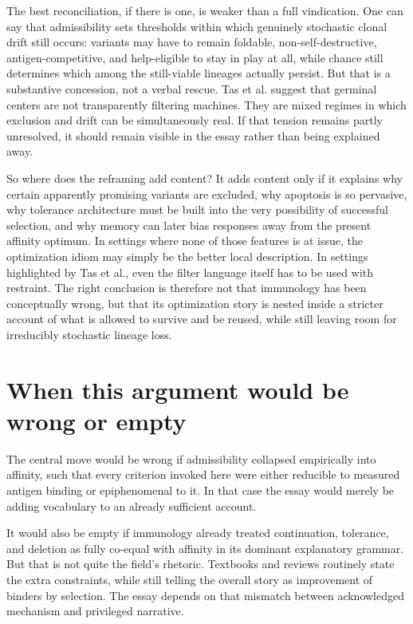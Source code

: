 \documentclass[11pt]{article}
\begin{document}
The best reconciliation, if there is one, is weaker than a full vindication. One can say that admissibility sets thresholds within which genuinely stochastic clonal drift still occurs: variants may have to remain foldable, non-self-destructive, antigen-competitive, and help-eligible to stay in play at all, while chance still determines which among the still-viable lineages actually persist. But that is a substantive concession, not a verbal rescue. Tas et al. suggest that germinal centers are not transparently filtering machines. They are mixed regimes in which exclusion and drift can be simultaneously real. If that tension remains partly unresolved, it should remain visible in the essay rather than being explained away.

So where does the reframing add content? It adds content only if it explains why certain apparently promising variants are excluded, why apoptosis is so pervasive, why tolerance architecture must be built into the very possibility of successful selection, and why memory can later bias responses away from the present affinity optimum. In settings where none of those features is at issue, the optimization idiom may simply be the better local description. In settings highlighted by Tas et al., even the filter language itself has to be used with restraint. The right conclusion is therefore not that immunology has been conceptually wrong, but that its optimization story is nested inside a stricter account of what is allowed to survive and be reused, while still leaving room for irreducibly stochastic lineage loss.

\section{When this argument would be wrong or empty}
The central move would be wrong if admissibility collapsed empirically into affinity, such that every criterion invoked here were either reducible to measured antigen binding or epiphenomenal to it. In that case the essay would merely be adding vocabulary to an already sufficient account.

It would also be empty if immunology already treated continuation, tolerance, and deletion as fully co-equal with affinity in its dominant explanatory grammar. But that is not quite the field's rhetoric. Textbooks and reviews routinely state the extra constraints, while still telling the overall story as improvement of binders by selection. The essay depends on that mismatch between acknowledged mechanism and privileged narrative.
\end{document}
